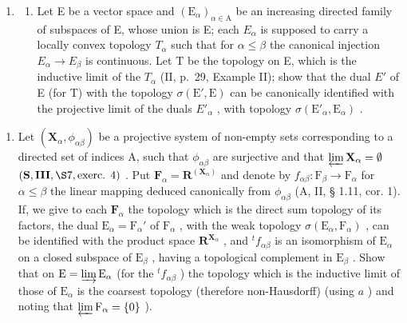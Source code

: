 \begin{enumerate}
\def\labelenumi{\arabic{enumi})}
\setcounter{enumi}{11}
\tightlist
\item
  \begin{enumerate}
  \def\labelenumii{\alph{enumii})}
  \tightlist
  \item
    Let E be a vector space and \((\mathrm{E}_{\alpha})_{\alpha\in\mathrm{A}}\) be an increasing directed family of subspaces of E, whose union is E; each \(E_{\alpha}\) is supposed to carry a locally convex topology \(T_{\alpha}\) such that for \(\alpha\leqslant\beta\) the canonical injection \(E_{\alpha}\to E_{\beta}\) is continuous. Let T be the topology on E, which is the inductive limit of the \(T_{\alpha}\) (II, p.~29, Example II); show that the dual \(E'\) of E (for T) with the topology \(\sigma(\mathrm{E}',\mathrm{E})\) can be canonically identified with the projective limit of the duals \(E'_{\alpha}\) , with topology \(\sigma(\mathrm{E}'_{\alpha},\mathrm{E}_{\alpha})\) .
  \end{enumerate}
\end{enumerate}

\begin{enumerate}
\def\labelenumi{\alph{enumi})}
\setcounter{enumi}{1}
\tightlist
\item
  Let \((\mathbf{X}_{\alpha},\phi_{\alpha \beta})\) be a projective system of non-empty sets corresponding to a directed set of indices A, such that \(\phi_{\alpha \beta}\) are surjective and that \(\varprojlim \mathbf{X}_{\alpha} = \emptyset\) \((\mathbf{S},\mathbf{III},\S 7,\text{exerc. }4)\) . Put \(\mathbf{F}_{\alpha} = \mathbf{R}^{(\mathbf{X}_{\alpha})}\) and denote by \(f_{\alpha \beta}:\mathrm{F}_{\beta}\to \mathrm{F}_{\alpha}\) for \(\alpha \leqslant \beta\) the linear mapping deduced canonically from \(\phi_{\alpha \beta}\) (A, II, § 1.11, cor. 1). If, we give to each \(\mathbf{F}_{\alpha}\) the topology which is the direct sum topology of its factors, the dual \(\mathrm{E}_{\alpha} = \mathrm{F}_{\alpha}'\) of \(\mathrm{F}_{\alpha}\) , with the weak topology \(\sigma(\mathrm{E}_{\alpha}, \mathrm{F}_{\alpha})\) , can be identified with the product space \(\mathbf{R}^{\mathbf{X}_{\alpha}}\) , and \({}^{t}f_{\alpha\beta}\) is an isomorphism of \(\mathrm{E}_{\alpha}\) on a closed subspace of \(\mathrm{E}_{\beta}\) , having a topological complement in \(\mathrm{E}_{\beta}\) . Show that on \(\mathrm{E} = \varinjlim \mathrm{E}_{\alpha}\) (for the \({}^{t}f_{\alpha\beta}\) ) the topology which is the inductive limit of those of \(\mathrm{E}_{\alpha}\) is the coarsest topology (therefore non-Hausdorff) (using \(a\) ) and noting that \(\varprojlim \mathrm{F}_{\alpha} = \{0\}\) ).
\end{enumerate}

